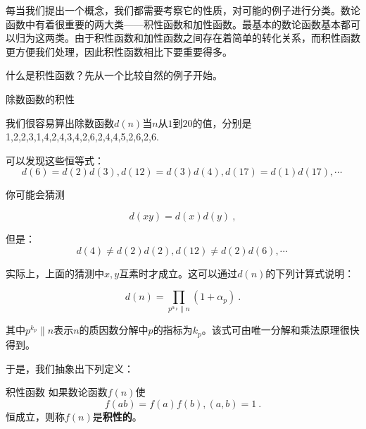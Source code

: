 

\begin{issues}
\issueAbstract
\end{issues}

每当我们提出一个概念，我们都需要考察它的性质，对可能的例子进行分类。数论函数中有着很重要的两大类——积性函数和加性函数。最基本的数论函数基本都可以归为这两类。由于积性函数和加性函数之间存在着简单的转化关系，而积性函数更方便我们处理，因此积性函数相比下要重要得多。

什么是积性函数？先从一个比较自然的例子开始。

\begin{example}{除数函数的积性}

我们很容易算出除数函数$d(n)$当$n$从$1$到$20$的值，分别是1,2,2,3,1,4,2,4,3,4,2,6,2,4,4,5,2,6,2,6.

可以发现这些恒等式：
\begin{equation}
d(6)=d(2)d(3),d(12)=d(3)d(4),d(17)=d(1)d(17),\cdots~
\end{equation}

你可能会猜测

\begin{equation}
d(xy)=d(x)d(y)~,
\end{equation}

但是：
\begin{equation}
d(4)\neq d(2)d(2),d(12)\neq d(2)d(6), \cdots~
\end{equation}

实际上，上面的猜测中$x,y$互素时才成立。这可以通过$d(n)$的下列计算式说明：

\begin{equation}
d(n)=\prod\limits_{p^{\alpha\!\:_p}\| n}(1+\alpha_p)~.
\end{equation}

其中$p^{k_p}\| n$表示$n$的质因数分解中$p$的指标为$k_p$。该式可由唯一分解和乘法原理很快得到。

\end{example}

于是，我们抽象出下列定义：

\begin{definition}{积性函数}
如果数论函数$f(n)$使
\begin{equation}
f(ab)=f(a)f(b),(a,b)=1~.
\end{equation}
恒成立，则称$f(n)$是\textbf{积性的}。
\end{definition}

